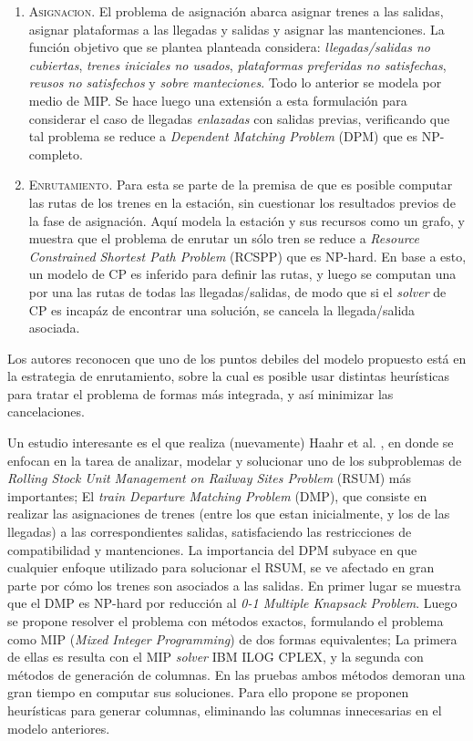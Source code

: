 \documentclass[letter, 10pt]{article}
\begin{document}
\begin{description}
	\begin{enumerate}
		\item \textsc{Asignacion.} El problema de asignación abarca asignar trenes a las salidas, asignar plataformas a las llegadas y salidas y asignar las mantenciones. La función objetivo que se plantea planteada considera: \textit{llegadas/salidas no cubiertas}, \textit{trenes iniciales no usados}, \textit{plataformas preferidas no satisfechas}, \textit{reusos no satisfechos} y \textit{sobre manteciones}. Todo lo anterior se modela por medio de MIP. Se hace luego una extensión a esta formulación para considerar el caso de llegadas \textit{enlazadas} con salidas previas, verificando que tal problema se reduce a \textit{Dependent Matching Problem} (DPM) que es NP-completo.  
		\item \textsc{Enrutamiento.} Para esta se parte de la premisa de que es posible computar las rutas de los trenes en la estación, sin cuestionar los resultados previos de la fase de asignación. Aquí modela la estación y sus recursos como un grafo, y muestra que el problema de enrutar un sólo tren se reduce a \textit{Resource Constrained Shortest Path Problem} (RCSPP) que es NP-hard. En base a esto, un modelo de CP es inferido para definir las rutas, y luego se computan una por una las rutas de todas las llegadas/salidas, de modo que si el \textit{solver} de CP es incapáz de encontrar una solución, se cancela la llegada/salida asociada.
	\end{enumerate}
	Los autores reconocen que uno de los puntos debiles del modelo propuesto está en la estrategia de enrutamiento, sobre la cual es posible usar distintas heurísticas para tratar el problema de formas más integrada, y así minimizar las cancelaciones.

	Un estudio interesante es el que realiza (nuevamente) Haahr et al. \cite{Haahr}, en donde se enfocan en la tarea de analizar, modelar y solucionar uno de los subproblemas de \textit{Rolling Stock Unit Management on Railway Sites Problem} (RSUM) más importantes; El \textit{train Departure Matching Problem} (DMP), que consiste en realizar las asignaciones de trenes (entre los que estan inicialmente, y los de las llegadas) a las correspondientes salidas, satisfaciendo las restricciones de compatibilidad y mantenciones. La importancia del DPM subyace en que cualquier enfoque utilizado para solucionar el RSUM, se ve afectado en gran parte por cómo los trenes son asociados a las salidas. En primer lugar se muestra que el DMP es NP-hard por reducción al \textit{0-1 Multiple Knapsack Problem}. Luego se propone resolver el problema con métodos exactos, formulando el problema como MIP (\textit{Mixed Integer Programming}) de dos formas equivalentes; La primera de ellas es resulta con el MIP \textit{solver} IBM ILOG CPLEX, y la segunda con métodos de generación de columnas. En las pruebas ambos métodos demoran una gran tiempo en computar sus soluciones. Para ello propone se proponen heurísticas para generar columnas, eliminando las columnas innecesarias en el modelo anteriores.


\end{description}
\end{document}
